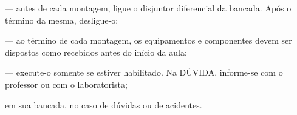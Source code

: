 
\begin{normas}[II]
   --- antes de cada montagem, ligue o disjuntor
  diferencial da bancada. Após o término da mesma, desligue-o;

   --- ao término de cada montagem, os
  equipamentos e componentes devem ser dispostos como recebidos antes do início da aula;

   --- execute-o somente se estiver habilitado. Na
  DÚVIDA, informe-se com o professor ou com o laboratorista;

   em sua bancada, no caso de dúvidas ou de
  acidentes.
\end{normas}
